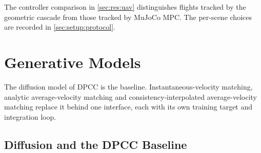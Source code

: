 \documentclass[headsepline,footsepline,footinclude=false,oneside,fontsize=11pt,paper=a4,listof=totoc,bibliography=totoc]{scrbook}
\theoremstyle{definition}
\theoremstyle{plain}
\theoremstyle{remark}
\begin{document}
The controller comparison in \autoref{sec:res:uav} distinguishes flights tracked by the geometric
cascade from those tracked by MuJoCo MPC. The per-scene choices are recorded in
\autoref{sec:setup:protocol}.

\section{Generative Models}\label{sec:method:engine}

The diffusion model of \ac{DPCC} is the baseline. Instantaneous-velocity matching, analytic
average-velocity matching and consistency-interpolated average-velocity matching replace it
behind one interface, each with its own training target and integration loop.

\subsection{Diffusion and the DPCC Baseline}\label{sec:method:diffusion}
\end{document}
